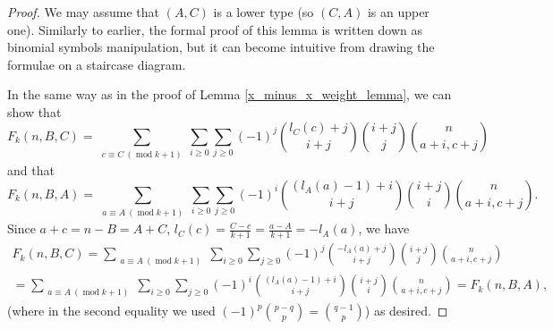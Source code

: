 \documentclass[11pt, reqno]{amsart}
\numberwithin{equation}{section}
\newcommand\modd{\operatorname{mod}}
\begin{document}
\begin{proof}
    We may assume that $(A, C)$ is a lower type (so $(C, A)$ is an upper one). Similarly to earlier, the formal proof of this lemma is written down as binomial symbols manipulation, but it can become intuitive from drawing the formulae on a staircase diagram.
    
    In the same way as in the proof of Lemma \ref{x_minus_x_weight_lemma}, we can show that
    \begin{equation*}
        F_k(n, B, C) = 
        \sum_{\substack{c \equiv C \ (\modd k+1)}} \sum_{i \geqslant 0} \sum_{j \geqslant 0} (-1)^j \binom{l_C(c)+j}{i+j}\binom{i+j}{j}\binom{n}{a+i, c+j}
    \end{equation*}
    and that
    \begin{equation*}
        F_k(n, B, A) = 
        \sum_{\substack{a \equiv A \ (\modd k+1)}} \sum_{i \geqslant 0} \sum_{j \geqslant 0} (-1)^i \binom{(l_A(a)-1)+i}{i+j}\binom{i+j}{i}\binom{n}{a+i, c+j}.
    \end{equation*}
    Since $a+c=n-B=A+C$, $l_C(c)=\frac{C-c}{k+1}=\frac{a-A}{k+1}=-l_A(a)$, we have
    \begin{multline*}
        F_k(n, B, C) = \sum_{\substack{a \equiv A \ (\modd k+1)}} \sum_{i \geqslant 0} \sum_{j \geqslant 0} (-1)^j \binom{-l_A(a)+j}{i+j}\binom{i+j}{j}\binom{n}{a+i, c+j}\\
        = \sum_{\substack{a \equiv A \ (\modd k+1)}} \sum_{i \geqslant 0} \sum_{j \geqslant 0} (-1)^i \binom{(l_A(a)-1)+i}{i+j}\binom{i+j}{i}\binom{n}{a+i, c+j} = F_k(n, B, A),
    \end{multline*}
    (where in the second equality we used $(-1)^p\binom{p-q}{p}=\binom{q-1}{p}$) as desired.
\end{proof}

\xminusxotherformula*
\end{document}
